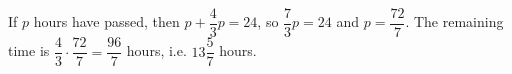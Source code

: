 If $p$ hours have passed, then $p+\dfrac43p=24$, so $\dfrac73p=24$ and $p=\dfrac{72}{7}$. The remaining time is $\dfrac43\cdot\dfrac{72}7=\boxed{\dfrac{96}{7}}$ hours, i.e. $13\dfrac57$ hours.
